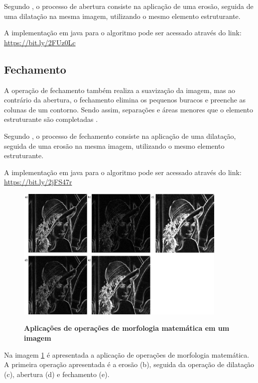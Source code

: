 \documentclass[
	12pt,				%
	oneside,			%
	a4paper,			%
	english,			%
	french,				%
	spanish,			%
	brazil,				%
	]{abntex2}
\begin{document}
Segundo \citet{pedriniSchwartz:2008}, o processo de abertura consiste na aplicação de uma erosão, seguida de uma dilatação na mesma imagem, utilizando o mesmo elemento estruturante.

A implementação em java para o algoritmo pode ser acessado através do link: \url{https://bit.ly/2FUz0Lc}

\subsection{Fechamento}

A operação de fechamento também realiza a suavização da imagem, mas ao contrário da abertura, o fechamento elimina os pequenos buracos e preenche as colunas de um contorno. Sendo assim, separações e áreas menores que o elemento estruturante são completadas \cite{gonzalesWoods:2008}.

Segundo \citet{pedriniSchwartz:2008}, o processo de fechamento consiste na aplicação de uma dilatação, seguida de uma erosão na mesma imagem, utilizando o mesmo elemento estruturante.

A implementação em java para o algoritmo pode ser acessado através do link: \url{https://bit.ly/2jFS47r}

\begin{figure}[ht]
\centering
\caption{\textbf{Aplicações de operações de morfologia matemática em um imagem}}
\includegraphics[width=0.9\textwidth]{imagens/morfologia.png}
\sourceAuthor
\label{fig:morfologia}
\end{figure}

Na imagem \ref{fig:morfologia} é apresentada a aplicação de operações de morfologia matemática. A primeira operação apresentada é a erosão (b), seguida da operação de dilatação (c), abertura (d) e fechamento (e).
    
\end{document}
